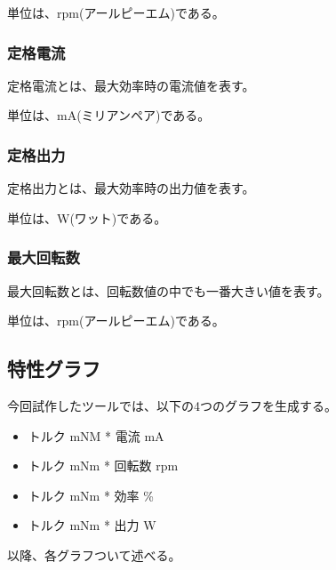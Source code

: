 単位は、rpm(アールピーエム)である。

\subsubsection{定格電流}\label{sub:sub:teikakuden}
定格電流とは、最大効率時の電流値を表す。

単位は、mA(ミリアンペア)である。
\subsubsection{定格出力}\label{sub:sub:teikakusyutu}
定格出力とは、最大効率時の出力値を表す。

単位は、W(ワット)である。
\subsubsection{最大回転数}\label{sub:sub:saidaikai}
最大回転数とは、回転数値の中でも一番大きい値を表す。

単位は、rpm(アールピーエム)である。
\subsection{特性グラフ}\label{sub:tokuseigurahu}
今回試作したツールでは、以下の4つのグラフを生成する。
\begin{itemize}
	\item トルク mNM * 電流 mA
	\item トルク mNm * 回転数 rpm
	\item トルク mNm * 効率 \%
	\item トルク mNm * 出力 W
\end{itemize}
以降、各グラフついて述べる。
